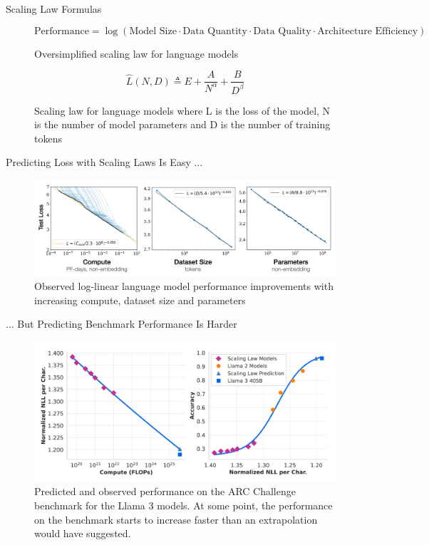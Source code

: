 \documentclass[aspectratio=169]{beamer}
\begin{document}
    \begin{frame}{Scaling Law Formulas}
        \begin{figure}
            \[
                \text{Performance} = \log(\text{Model Size} \cdot \text{Data Quantity} \cdot \text{Data Quality} \cdot \text{Architecture Efficiency})
            \]
            \caption{Oversimplified scaling law for language models}
        \end{figure}
        \begin{figure}
            \[
                \hat{L}(N, D) \triangleq E + \frac{A}{N^\alpha} + \frac{B}{D^\beta}
            \]
            \caption{Scaling law for language models where L is the loss of the model, N is the number of model parameters and D is the number of training tokens~\parencite{hoffmann_training_2022}}
        \end{figure}
    \end{frame}
    \begin{frame}{Predicting Loss with Scaling Laws Is Easy ...}
        \begin{figure}
            \includegraphics[width=1\textwidth]{images/kaplan-et-al-2020-scaling}
            \caption{Observed log-linear language model performance improvements with increasing compute, dataset size and parameters~\parencite{kaplan_scaling_2020}}
        \end{figure}
    \end{frame}
    \begin{frame}{... But Predicting Benchmark Performance Is Harder}
        \begin{figure}
            \includegraphics[height=0.35\textwidth]{images/llama-3-scaling-law-prediction}
            \caption{Predicted and observed performance on the ARC Challenge benchmark for the Llama 3 models. At some point, the performance on the benchmark starts to increase faster than an extrapolation would have suggested.~\parencite{grattafiori_llama_2024}}
        \end{figure}
    \end{frame}
\end{document}
